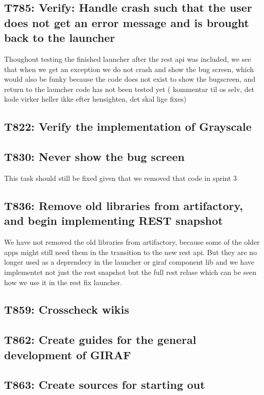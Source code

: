 \subsection{T785: Verify: Handle crash such that the user does not get an error message and
is brought back to the launcher}
Thoughout testing the finished launcher after the rest api was included, we see
that when we get an exception we do not crash and show the bug screen, which
would also be funky because the code does not exist to show the bugscreen, and
return to the launcher code has not been tested yet ( kommentar til os selv,
det kode virker heller ikke efter hensighten, det skal lige fixes)

\subsection{T822: Verify the implementation of Grayscale}

\subsection{T830: Never show the bug screen}
This task should still be fixed given that we removed that code in sprint 3

\subsection{T836: Remove old libraries from artifactory, and begin implementing REST
snapshot}
We have not removed the old libraries from artifactory, because some of the
older apps might still need them in the transition to the new rest api. But they
are no longer used as a deprendecy in the launcher or giraf component lib and we
have implementet not just the rest snapshot but the full rest relase which can
be seen how we use it in the rest fix launcher.

\subsection{T859: Crosscheck wikis}

\subsection{T862: Create guides for the general development of GIRAF}

\subsection{T863: Create sources for starting out}

